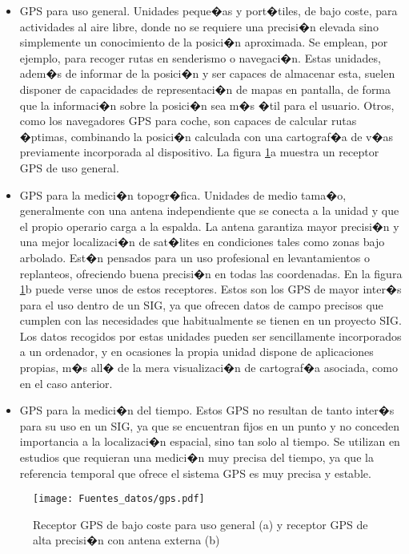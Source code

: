 \begin{itemize}
	\item GPS para uso general. Unidades peque�as y port�tiles, de bajo coste, para actividades al aire libre, donde no se requiere una precisi�n elevada sino simplemente un conocimiento de la posici�n aproximada. Se emplean, por ejemplo, para recoger rutas en senderismo o navegaci�n. Estas unidades, adem�s de informar de la posici�n y ser capaces de almacenar esta, suelen disponer de capacidades de representaci�n de mapas en pantalla, de forma que la informaci�n sobre la posici�n sea m�s �til para el usuario. Otros, como los navegadores GPS para coche, son capaces de calcular rutas �ptimas, combinando la posici�n calculada con una cartograf�a de v�as previamente incorporada al dispositivo.
		La figura \ref{Fig:gps_1}a muestra un receptor GPS de uso general.
	\item GPS para la medici�n topogr�fica. Unidades de medio tama�o, generalmente con una antena independiente que se conecta a la unidad y que el propio operario carga a la espalda. La antena garantiza mayor precisi�n y una mejor localizaci�n de sat�lites en condiciones tales como zonas bajo arbolado. Est�n pensados para un uso profesional en levantamientos o replanteos, ofreciendo buena precisi�n en todas las coordenadas. 
	En la figura \ref{Fig:gps_1}b puede verse unos de estos receptores.
	Estos son los GPS de mayor inter�s para el uso dentro de un SIG, ya que ofrecen datos de campo precisos que cumplen con las necesidades que habitualmente se tienen en un proyecto SIG. Los datos recogidos por estas unidades pueden ser sencillamente incorporados a un ordenador, y en ocasiones la propia unidad dispone de aplicaciones propias, m�s all� de la mera visualizaci�n de cartograf�a asociada, como en el caso anterior.
	\item GPS para la medici�n del tiempo. Estos GPS no resultan de tanto inter�s para su uso en un SIG, ya que se encuentran fijos en un punto y no conceden importancia a la localizaci�n espacial, sino tan solo al tiempo. Se utilizan en estudios que requieran una medici�n muy precisa del tiempo, ya que la referencia temporal que ofrece el sistema GPS es muy precisa y estable.
\end{itemize}

\begin{figure}
\centering
\texttt{[image: Fuentes\_datos/gps.pdf]}
\caption{\small Receptor GPS de bajo coste para uso general (a) y receptor GPS de alta precisi�n con antena externa (b)}
\label{Fig:gps_1} 
\end{figure}

